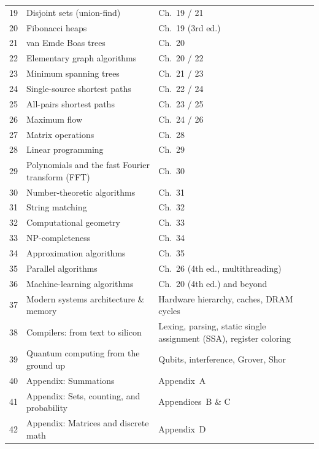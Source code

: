 \begin{longtable}{@{}p{}p{}p{}@{}}
19 & Disjoint sets (union-find)            & Ch.~19 / 21 \\
20 & Fibonacci heaps                       & Ch.~19 (3rd ed.) \\
21 & van Emde Boas trees                   & Ch.~20 \\
22 & Elementary graph algorithms           & Ch.~20 / 22 \\
23 & Minimum spanning trees                & Ch.~21 / 23 \\
24 & Single-source shortest paths          & Ch.~22 / 24 \\
25 & All-pairs shortest paths              & Ch.~23 / 25 \\
26 & Maximum flow                          & Ch.~24 / 26 \\
27 & Matrix operations                     & Ch.~28 \\
28 & Linear programming                    & Ch.~29 \\
29 & Polynomials and the fast Fourier transform (FFT) & Ch.~30 \\
30 & Number-theoretic algorithms           & Ch.~31 \\
31 & String matching                       & Ch.~32 \\
32 & Computational geometry                & Ch.~33 \\
33 & NP-completeness                       & Ch.~34 \\
34 & Approximation algorithms              & Ch.~35 \\
35 & Parallel algorithms                   & Ch.~26 (4th ed., multithreading) \\
36 & Machine-learning algorithms           & Ch.~20 (4th ed.) and beyond \\
37 & Modern systems architecture \& memory & Hardware hierarchy, caches, DRAM cycles \\
38 & Compilers: from text to silicon       & Lexing, parsing, static single assignment (SSA), register coloring \\
39 & Quantum computing from the ground up  & Qubits, interference, Grover, Shor \\
40 & Appendix: Summations                  & Appendix~A \\
41 & Appendix: Sets, counting, and probability & Appendices~B \& C \\
42 & Appendix: Matrices and discrete math  & Appendix~D \\
\bottomrule
\end{longtable}

